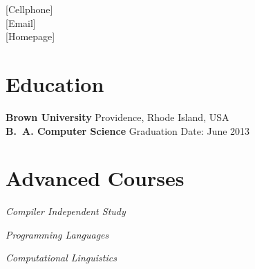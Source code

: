 \documentclass[margin,line]{resume}
\begin{document}

\begin{resume}


    \hfill {}          [Cellphone]  \vspace{0mm}\\\vspace{0mm}%
    \hfill {}     [Email]  \vspace{0mm}\\\vspace{-4.5mm}%
    \hfill {}      [Homepage]  \vspace{0mm}\\\vspace{-4.5mm}%

    \section{\mysidestyle{} Education}

    \textbf{Brown University}    \hfill Providence, Rhode Island, USA     \vspace{2mm}\\
    \textbf{B.\ A. Computer Science}  \hfill Graduation Date: June 2013 \vspace{-3mm}\\\vspace{-1.5mm}%

    \section{\mysidestyle{} Advanced Courses}

    \textsl{Compiler Independent Study}   \par\vspace{-4mm}%
     {\addtolength{\leftskip}{2 mm} 
      \par}
 
     \textsl{Programming Languages} \par\vspace{-4mm}%
    {\addtolength{\leftskip}{2 mm} 
    \par}
    
    \textsl{Computational Linguistics} \par\vspace{-4mm}%
     {\addtolength{\leftskip}{2 mm} 
         \par}
     

\end{resume}
\end{document}
